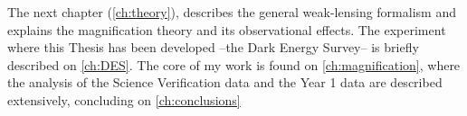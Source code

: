 The next chapter (\autoref{ch:theory}), describes the general weak-lensing formalism and explains the magnification theory and its observational effects. The experiment where this Thesis has been developed --the Dark Energy Survey-- is briefly described on \autoref{ch:DES}. The core of my work is found on \autoref{ch:magnification}, where the analysis of the Science Verification data and the Year 1 data are described extensively, concluding on \autoref{ch:conclusions}
